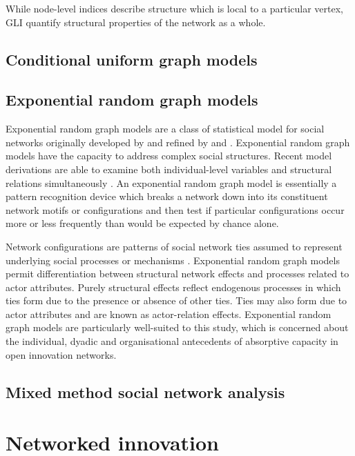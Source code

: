 While node-level indices describe structure which is local to a particular vertex, GLI quantify structural properties of the network as a whole.


\subsection{Conditional uniform graph models}



\subsection{Exponential random graph models}

Exponential random graph models are a class of statistical model for social networks originally developed by \citet{frank1986markov} and refined by \citet{wasserman1996logit} and \citet{pattison1999logit}. Exponential random graph models have the capacity to address complex social structures. Recent model derivations are able to examine both individual-level variables and structural relations simultaneously \citep{robins2007recent}. An exponential random graph model is essentially a pattern recognition device which breaks a network down into its constituent network motifs or configurations and then test if particular configurations occur more or less frequently than would be expected by chance alone. \medskip

Network configurations are patterns of social network ties assumed to represent underlying social processes or mechanisms \citep{lusher2014cooperative}. Exponential random graph models permit differentiation between structural network effects and processes related to actor attributes. Purely structural effects reflect endogenous processes in which ties form due to the presence or absence of other ties. Ties may also form due to actor attributes and are known as actor-relation effects. Exponential random graph models are particularly well-suited to this study, which is concerned about the individual, dyadic and organisational antecedents of absorptive capacity in open innovation networks.


\subsection{Mixed method social network analysis}

\section{Networked innovation}

